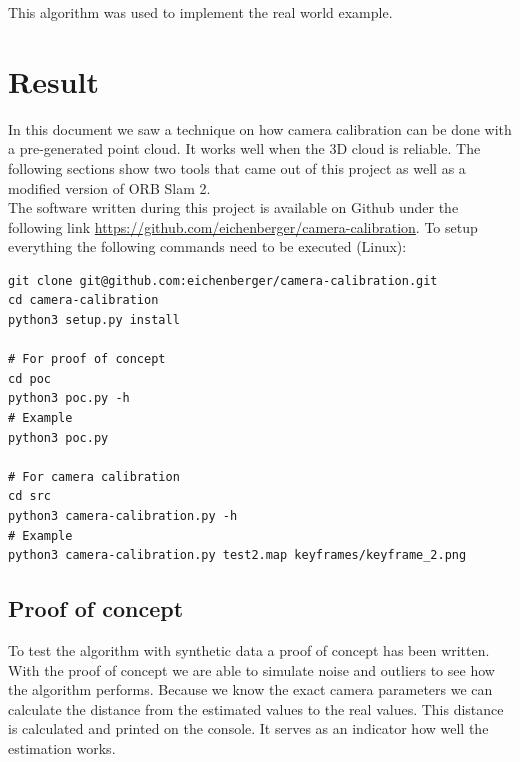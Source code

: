 \documentclass[11pt,a4paper,titlepage,oneside]{report}
\begin{document}
This algorithm was used to implement the real world example.

\chapter{Result}

In this document we saw a technique on how camera calibration can be done with a pre-generated point cloud. It works well when the 3D cloud is reliable. The following sections show two tools that came out of this project as well as a modified version of ORB Slam 2.\\

The software written during this project is available on Github under the following link \url{https://github.com/eichenberger/camera-calibration}. To setup everything the following commands need to be executed (Linux):
\small
\lstset{language=bash}
\begin{lstlisting}
git clone git@github.com:eichenberger/camera-calibration.git
cd camera-calibration
python3 setup.py install

# For proof of concept
cd poc
python3 poc.py -h
# Example
python3 poc.py

# For camera calibration
cd src
python3 camera-calibration.py -h
# Example
python3 camera-calibration.py test2.map keyframes/keyframe_2.png
\end{lstlisting}
\normalsize

\section{Proof of concept}

To test the algorithm with synthetic data a proof of concept has been written. With the proof of concept we are able to simulate noise and outliers to see how the algorithm performs. Because we know the exact camera parameters we can calculate the distance from the estimated values to the real values. This distance is calculated and printed on the console. It serves as an indicator how well the estimation works.\\
\end{document}
